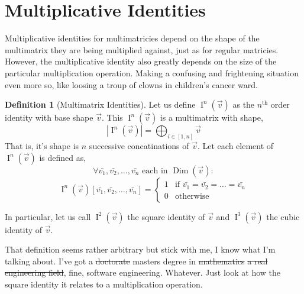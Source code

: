 \documentclass[12pt]{book}
\theoremstyle{plain}
\theoremstyle{definition}
\newtheorem{definition}{Definition}[chapter]
\theoremstyle{ppart}
\theoremstyle{case}
\theoremstyle{solution}
\DeclareMathOperator{\Dim}{Dim}
\DeclareMathOperator{\Ident}{I}
\begin{document}
\section{Multiplicative Identities}

Multiplicative identities for multimatricies depend on the shape of the
multimatrix they are being multiplied against, just as for regular matricies.
However, the multiplicative identity also greatly depends on the size of
the particular multiplication operation. Making a confusing and frightening
situation even more so, like loosing a troup of clowns in children's cancer ward.

\begin{definition}[Multimatrix Identities]
\label{mm_mult_ident}
Let us define $\Ident^n(\vec{v})$ as the $n^{\text{th}}$ order identity with base shape
$\vec{v}$. This $\Ident^n(\vec{v})$ is a multimatrix with shape,
\[ |\Ident^n(\vec{v})| = \bigoplus_{i \in [1, n]} \vec{v} \]
That is, it's shape is $n$ successive concatinations of $\vec{v}$.
Let each element of $\Ident^n(\vec{v})$ is defined as,
\[ \forall \bar{v_1}, \bar{v_2}, \ldots, \bar{v_n} \text{ each in } \Dim(\vec{v}) : \]
\[
 \Ident^n(\vec{v})[\bar{v_1}, \bar{v_2}, \ldots, \bar{v_n}]
 = \left\{
  \begin{array}{ll}
    1 & \mbox{if } \bar{v_1} = \bar{v_2} = \ldots = \bar{v_n} \\
    0 & \mbox{otherwise}
  \end{array}
 \right.
\]

In particular, let us call $\Ident^2(\vec{v})$ the square identity of $\vec{v}$ and
$\Ident^3(\vec{v})$ the cubic identity of $\vec{v}$.
\end{definition}

That definition seems rather arbitrary but stick with me, I know what I'm
talking about. I've got a \sout{doctorate}
masters degree in \sout{mathematics} \sout{a real engineering field}, fine, software
engineering. Whatever. Just look at how the
square identity it relates to a multiplication operation.
\end{document}
